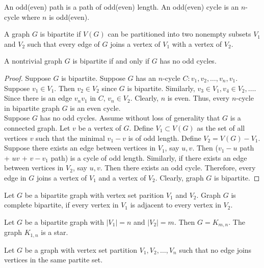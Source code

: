 \begin{remark}
	An odd(even) path is a path of odd(even) length. An odd(even) cycle is an $n$-cycle where $n$ is odd(even).
\end{remark}

\begin{definition}
	A graph $G$ is bipartite if $V(G)$ can be partitioned into two nonempty subsets $V_1$ and $V_2$ such that every edge of $G$ joins a vertex of $V_1$ with a vertex of $V_2$.
\end{definition}

\begin{theorem}
	A nontrivial graph $G$ is bipartite if and only if $G$ has no odd cycles.
\end{theorem}
\begin{proof}
	Suppose $G$ is bipartite.
	Suppose $G$ has an $n$-cycle $C : v_1,v_2,\dots,v_n,v_1$.
	Suppose $v_1 \in V_1$. Then $v_2 \in V_2$ since $G$ is bipartite.
	Similarly, $v_3 \in V_1, v_4 \in V_2, \dotsc$.
	Since there is an edge $v_nv_1$ in $C$, $v_n \in V_2$.
	Clearly, $n$ is even.
	Thus, every $n$-cycle in bipartite graph $G$ is an even cycle.\\

	Suppose $G$ has no odd cycles.
	Assume without loss of generality that $G$ is a connected graph.
	Let $v$ be a vertex of $G$.
	Define $V_1 \subset V(G)$ as the set of all vertices $v$ such that the minimal $v_1-v$ is of odd length.
	Define $V_2 = V(G) - V_1$.
	Suppose there exists an edge between vertices in $V_1$, say $u,v$.
	Then ($v_1-u$ path + $uv$ + $v-v_1$ path) is a cycle of odd length.
	Similarly, if there exists an edge between vertices in $V_2$, say $u,v$. Then there exists an odd cycle.
	Therefore, every edge in $G$ joins a vertex of $V_1$ and a vertex of $V_2$.
	Clearly, graph $G$ is bipartite.
\end{proof}

\begin{definition}
	Let $G$ be a bipartite graph with vertex set parition $V_1$ and $V_2$.
	Graph $G$ is complete bipartite, if every vertex in $V_1$ is adjacent to every vertex in $V_2$.
\end{definition}
\begin{remark}
	Let $G$ be a bipartite graph with $|V_1| = n$ and $|V_2| = m$.
	Then $G = K_{m,n}$.
	The graph $K_{1,n}$ is a star.
\end{remark}

\begin{definition}
	Let $G$ be a graph with vertex set partition $V_1,V_2,\dots,V_n$ such that no edge joins vertices in the same partite set.
\end{definition}

